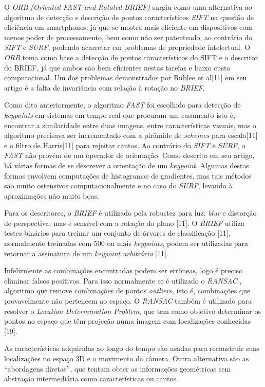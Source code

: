 O \textit{ORB (Oriented FAST and Rotated BRIEF)} surgiu como uma alternativa ao algoritmo de detecção e descrição de pontos característicos \textit{SIFT} na questão de eficiência em smartphones, já que se mostra mais eficiente em dispositivos com menos poder de processamento, bem como não ser patenteado, ao contrário do \textit{SIFT} e \textit{SURF}, podendo acarretar em problemas de propriedade intelectual. O \textit{ORB} toma como base a detecção de pontos característicos do SIFT e o descritor do BRIEF, já que ambos são bem eficientes nestas tarefas e baixo custo computacional. Um dos problemas demonstrados por Rublee et al[11] em seu artigo é a falta de invariância com relação à rotação no \textit{BRIEF}.

Como dito anteriormente, o algoritmo \textit{FAST} foi escolhido para detecção de \textit{keypoints} em sistemas em tempo real que procuram um casamento isto é, encontrar a similaridade entre duas imagens, entre características visuais, mas o algoritmo precisava ser incrementado com a pirâmide de \textit{schemes} para escala[11] e o filtro de Harris[11] para rejeitar cantos. Ao contrário do \textit{SIFT} e \textit{SURF}, o \textit{FAST} não provém de um operador de orientação. Como descrito em seu artigo, há várias formas de se descrever a orientação de um \textit{keypoint}. Algumas destas formas envolvem computações de histogramas de gradientes, mas tais métodos são muito ostensivos computacionalmente e no caso do \textit{SURF}, levando à aproximações não muito boas.

Para os descritores, o \textit{BRIEF} é utilizado pela robustez para luz, \textit{blur} e distorção de perspectiva, mas é sensível com a rotação do plano [11]. O \textit{BRIEF} utiliza testes binários para treinar um conjunto de árvores de classificação [11], normalmente treinadas com 500 ou mais \textit{keypoints}, podem ser utilizadas para retornar a assinatura de um \textit{keypoint arbitrário} [11].

Infelizmente as combinações encontradas podem ser errôneas, logo é preciso eliminar falsos positivos. Para isso normalmente se é utilizado o \textit{RANSAC} , algoritmo que remove combinações de pontos \textit{outliers}, isto é, combinações que provavelmente não pertencem ao espaço. O \textit{RANSAC} também é utilizado para resolver o \textit{Location Determination Problem}, que tem como objetivo determinar os pontos no espaço que têm projeção numa imagem com localizações conhecidas [19].

As características adquiridas ao longo do tempo são usadas para reconstruir suas localizações no espaço 3D e o movimento da câmera. Outra alternativa são as “abordagens diretas”, que tentam obter as informações geométricas sem abstração intermediária como características ou cantos.


